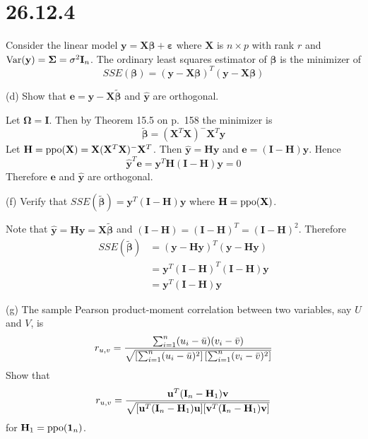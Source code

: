 \section*{26.12.4}
Consider the linear model
$\mathbf y=\mathbf X\bm\beta+\bm\varepsilon$ where $\mathbf X$
is $n\times p$ with rank $r$ and $\mathop{\rm Var}(\mathbf y)
=\bm\Sigma=\sigma^2\mathbf I_n$.
The ordinary least squares estimator of $\bm\beta$ is the
minimizer of
\[
SSE(\bm\beta)=(\mathbf y-\mathbf X\bm\beta)^T
(\mathbf y-\mathbf X\bm\beta)
\]

\bigskip
\noindent
(d) Show that $\mathbf e=\mathbf y-\mathbf X\bm{\tilde\beta}$
and $\mathbf{\hat y}$ are orthogonal.

\bigskip
\noindent
Let $\bm\Omega=\mathbf I$.
Then by Theorem 15.5 on p.\ 158 the minimizer is
\[
\bm{\tilde\beta}=(\mathbf X^T\mathbf X)^{-{}}\mathbf X^T\mathbf y
\]
Let $\mathbf H=\mathop{\rm ppo}(\mathbf X)=
\mathbf X(\mathbf X^T\mathbf X)^{-{}}\mathbf X^T$.
Then
$\mathbf{\hat y}=\mathbf{Hy}$ and
$\mathbf e=(\mathbf I-\mathbf H)\mathbf y$.
Hence
\[
\mathbf{\hat y}^T\mathbf e
=\mathbf y^T\mathbf H(\mathbf I-\mathbf H)\mathbf y=0
\]
Therefore $\mathbf e$ and $\mathbf{\hat y}$ are orthogonal.

\bigskip
\noindent
(f) Verify that
$SSE(\bm{\tilde\beta})=\mathbf y^T(\mathbf I-\mathbf H)\mathbf y$
where $\mathbf H=\mathop{\rm ppo}(\mathbf X)$.

\bigskip
\noindent
Note that $\mathbf{\hat y}=\mathbf{Hy}=\mathbf X\bm{\tilde\beta}$
and $(\mathbf I-\mathbf H)=(\mathbf I-\mathbf H)^T
=(\mathbf I-\mathbf H)^2$.
Therefore
\begin{align*}
SSE(\bm{\tilde\beta})
&=(\mathbf y-\mathbf{Hy})^T(\mathbf y-\mathbf{Hy})\\
&=\mathbf y^T(\mathbf I-\mathbf H)^T(\mathbf I-\mathbf H)\mathbf y\\
&=\mathbf y^T(\mathbf I-\mathbf H)\mathbf y
\end{align*}

\bigskip
\noindent
(g) The sample Pearson product-moment correlation between two
variables, say $U$ and $V$, is
\[
r_{u,v}={
\sum_{i=1}^n(u_i-\bar u)(v_i-\bar v)
\over
\sqrt{
\left[\sum_{i=1}^n(u_i-\bar u)^2\right]
\left[\sum_{i=1}^n(v_i-\bar v)^2\right]
}
}
\]
Show that
\[
r_{u,v}={
\mathbf u^T(\mathbf I_n-\mathbf H_1)\mathbf v
\over
\sqrt{
[\mathbf u^T(\mathbf I_n-\mathbf H_1)\mathbf u]
[\mathbf v^T(\mathbf I_n-\mathbf H_1)\mathbf v]
}
}
\]
for $\mathbf H_1=\mathop{\rm ppo}(\mathbf 1_n)$.

